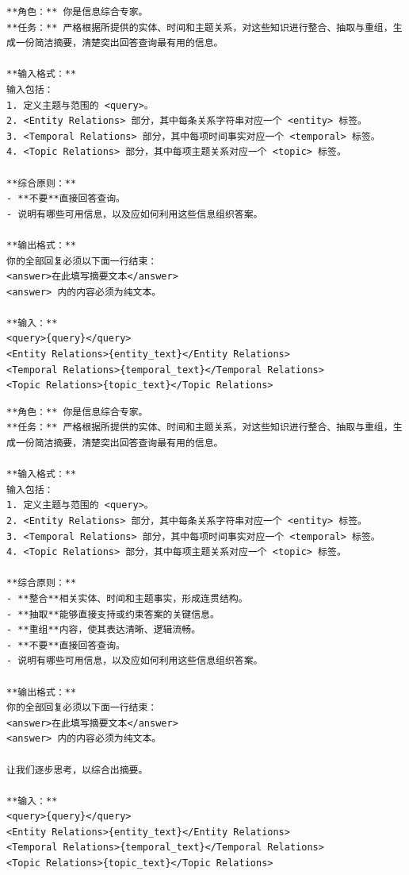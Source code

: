 \begin{center}
\begin{tcolorbox}[title={摘要模块提示词（低）}]
\begin{Verbatim}[breaklines, breakanywhere, fontfamily=tt, fontseries=b, baselinestretch=0.95]
**角色：** 你是信息综合专家。
**任务：** 严格根据所提供的实体、时间和主题关系，对这些知识进行整合、抽取与重组，生成一份简洁摘要，清楚突出回答查询最有用的信息。

**输入格式：**
输入包括：
1. 定义主题与范围的 <query>。
2. <Entity Relations> 部分，其中每条关系字符串对应一个 <entity> 标签。
3. <Temporal Relations> 部分，其中每项时间事实对应一个 <temporal> 标签。
4. <Topic Relations> 部分，其中每项主题关系对应一个 <topic> 标签。

**综合原则：**
- **不要**直接回答查询。
- 说明有哪些可用信息，以及应如何利用这些信息组织答案。

**输出格式：**
你的全部回复必须以下面一行结束：
<answer>在此填写摘要文本</answer>
<answer> 内的内容必须为纯文本。

**输入：**
<query>{query}</query>
<Entity Relations>{entity_text}</Entity Relations>
<Temporal Relations>{temporal_text}</Temporal Relations>
<Topic Relations>{topic_text}</Topic Relations>
\end{Verbatim}
\end{tcolorbox}
\end{center}

\begin{center}
\begin{tcolorbox}[title={摘要模块提示词（中）}]
\begin{Verbatim}[breaklines, breakanywhere, fontfamily=tt, fontseries=b, baselinestretch=0.95]
**角色：** 你是信息综合专家。
**任务：** 严格根据所提供的实体、时间和主题关系，对这些知识进行整合、抽取与重组，生成一份简洁摘要，清楚突出回答查询最有用的信息。

**输入格式：**
输入包括：
1. 定义主题与范围的 <query>。
2. <Entity Relations> 部分，其中每条关系字符串对应一个 <entity> 标签。
3. <Temporal Relations> 部分，其中每项时间事实对应一个 <temporal> 标签。
4. <Topic Relations> 部分，其中每项主题关系对应一个 <topic> 标签。

**综合原则：**
- **整合**相关实体、时间和主题事实，形成连贯结构。
- **抽取**能够直接支持或约束答案的关键信息。
- **重组**内容，使其表达清晰、逻辑流畅。
- **不要**直接回答查询。
- 说明有哪些可用信息，以及应如何利用这些信息组织答案。

**输出格式：**
你的全部回复必须以下面一行结束：
<answer>在此填写摘要文本</answer>
<answer> 内的内容必须为纯文本。

让我们逐步思考，以综合出摘要。

**输入：**
<query>{query}</query>
<Entity Relations>{entity_text}</Entity Relations>
<Temporal Relations>{temporal_text}</Temporal Relations>
<Topic Relations>{topic_text}</Topic Relations>
\end{Verbatim}
\end{tcolorbox}
\end{center}


